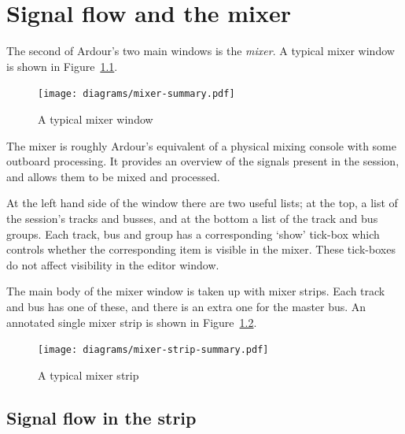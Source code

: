 \documentclass[10pt,a4paper]{book}
\begin{document}

\chapter{Signal flow and the mixer}
\label{ch:signal-flow-and-the-mixer}


The second of Ardour's two main windows is the \emph{mixer}.  A
typical mixer window is shown in Figure~\ref{fig:mixer-summary}.

\begin{figure}[ht]
\begin{center}
\texttt{[image: diagrams/mixer-summary.pdf]}
\end{center}
\caption{A typical mixer window}
\label{fig:mixer-summary}
\end{figure}

The mixer is roughly Ardour's equivalent of a physical mixing console
with some outboard processing.  It provides an overview of the signals
present in the session, and allows them to be mixed and processed.

At the left hand side of the window there are two useful lists; at the
top, a list of the session's tracks and busses, and at the bottom a
list of the track and bus groups.  Each track, bus and group has a
corresponding `show' tick-box which controls whether the corresponding
item is visible in the mixer.  These tick-boxes do not affect
visibility in the editor window.

The main body of the mixer window is taken up with mixer strips.  Each
track and bus has one of these, and there is an extra one for the
master bus.  An annotated single mixer strip is shown in
Figure~\ref{fig:mixer-strip-summary}.

\begin{figure}[ht]
\begin{center}
\texttt{[image: diagrams/mixer-strip-summary.pdf]}
\end{center}
\caption{A typical mixer strip}
\label{fig:mixer-strip-summary}
\end{figure}

\section{Signal flow in the strip}
\end{document}
